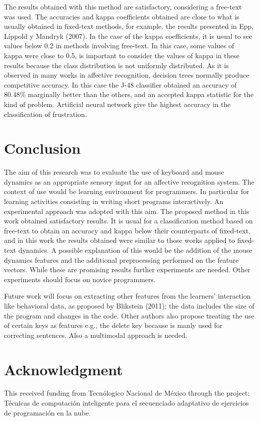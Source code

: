\documentclass[conference]{IEEEtran}
\begin{document}
The results obtained with this method are satisfactory, considering a free-text
was used. The accuracies and kappa coefficients obtained are close to what is
usually obtained in fixed-text methods, for example, the results presented in
Epp, Lippold y Mandryk (2007). In the case of the kappa coefficients, it is
usual to see values below 0.2 in methods involving free-text. In this case, some
values of kappa were close to 0.5, is important to consider the values of kappa
in these results because the class distribution is not uniformly distributed. As
it is observed in many works in affective recognition, decision trees normally
produce competitive accuracy. In this case the J-48 classifier obtained an
accuracy of 80.48\% marginally better than the others, and an accepted kappa
statistic for the kind of problem. Artificial neural network give the highest
accuracy in the classification of frustration.

 
\section{Conclusion}
The aim of this research was to evaluate the use of keyboard and mouse dynamics 
as an appropriate sensory input for an affective recognition system. The context
of use would be learning environment for programmers. In particular for learning
activities consisting in writing short programs interactively. An experimental
approach was adopted with this aim. The proposed method in this work obtained
satisfactory results. It is usual for a classification method based on free-text
to obtain an accuracy and kappa below their counterparts of fixed-text, and in this
work the results obtained were similar to those works applied to fixed-text 
dynamics. A possible explanation of this would be the addition of the mouse 
dynamics features and the additional preprocessing performed on the feature vectors. 
While these are promising results further experiments are needed. Other experiments
should focus on novice programmers.

Future work will focus on extracting other features from the learners’ interaction
like behavioral data, as proposed by Blikstein (2011); the data includes the size
of the program and changes in the code. Other authors also propose treating the use
of certain keys as features e.g., the delete key because is manly used for correcting
sentences. Also a multimodal approach is needed. 

\section*{Acknowledgment} 
This received funding from Tecnólogico Nacional de México through the project: Técnicas de
computación inteligente para el secuenciado adaptativo de ejercicios de
programación en la nube.
  
\end{document}
